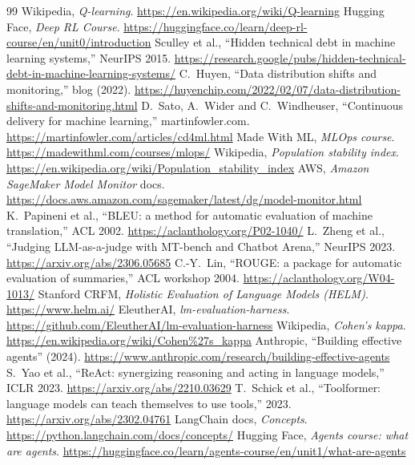 \begin{thebibliography}{99}
 Wikipedia, \emph{Q-learning}. \url{https://en.wikipedia.org/wiki/Q-learning}
 Hugging Face, \emph{Deep RL Course}. \url{https://huggingface.co/learn/deep-rl-course/en/unit0/introduction}
 Sculley et al., ``Hidden technical debt in machine learning systems,'' NeurIPS 2015. \url{https://research.google/pubs/hidden-technical-debt-in-machine-learning-systems/}
 C.~Huyen, ``Data distribution shifts and monitoring,'' blog (2022). \url{https://huyenchip.com/2022/02/07/data-distribution-shifts-and-monitoring.html}
 D.~Sato, A.~Wider and C.~Windheuser, ``Continuous delivery for machine learning,'' martinfowler.com. \url{https://martinfowler.com/articles/cd4ml.html}
 Made With ML, \emph{MLOps course}. \url{https://madewithml.com/courses/mlops/}
 Wikipedia, \emph{Population stability index}. \url{https://en.wikipedia.org/wiki/Population_stability_index}
 AWS, \emph{Amazon SageMaker Model Monitor} docs. \url{https://docs.aws.amazon.com/sagemaker/latest/dg/model-monitor.html}
 K.~Papineni et al., ``BLEU: a method for automatic evaluation of machine translation,'' ACL 2002. \url{https://aclanthology.org/P02-1040/}
 L.~Zheng et al., ``Judging LLM-as-a-judge with MT-bench and Chatbot Arena,'' NeurIPS 2023. \url{https://arxiv.org/abs/2306.05685}
 C.-Y.~Lin, ``ROUGE: a package for automatic evaluation of summaries,'' ACL workshop 2004. \url{https://aclanthology.org/W04-1013/}
 Stanford CRFM, \emph{Holistic Evaluation of Language Models (HELM)}. \url{https://www.helm.ai/}
 EleutherAI, \emph{lm-evaluation-harness}. \url{https://github.com/EleutherAI/lm-evaluation-harness}
 Wikipedia, \emph{Cohen's kappa}. \url{https://en.wikipedia.org/wiki/Cohen%27s_kappa}
 Anthropic, ``Building effective agents'' (2024). \url{https://www.anthropic.com/research/building-effective-agents}
 S.~Yao et al., ``ReAct: synergizing reasoning and acting in language models,'' ICLR 2023. \url{https://arxiv.org/abs/2210.03629}
 T.~Schick et al., ``Toolformer: language models can teach themselves to use tools,'' 2023. \url{https://arxiv.org/abs/2302.04761}
 LangChain docs, \emph{Concepts}. \url{https://python.langchain.com/docs/concepts/}
 Hugging Face, \emph{Agents course: what are agents}. \url{https://huggingface.co/learn/agents-course/en/unit1/what-are-agents}

\end{thebibliography}
